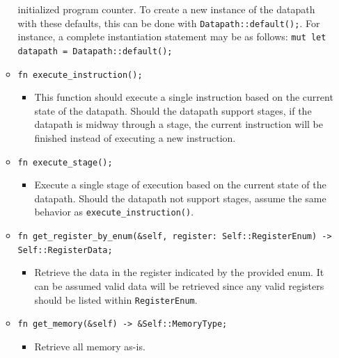 \documentclass[
    paper=letter,
    parskip=half,
    fontsize=12pt,
    titlepage=firstiscover,
    toc=bibliography,
    numbers=endperiod
]{scrartcl}
\providecommand{\tightlist}{%
  \setlength{\itemsep}{0pt}\setlength{\parskip}{0pt}}
\begin{document}
\begin{itemize}
\begin{itemize}
                    initialized program counter. To create a new instance of the datapath
                    with these defaults, this can be done with
                    \texttt{Datapath::default();}. For instance, a complete instantiation
                    statement may be as follows: \texttt{mut let datapath =
                        Datapath::default();}
              \item \texttt{fn execute\_instruction();}
                    \begin{itemize}
                        \tightlist
                        \item This function should execute a single instruction based on the current
                              state of the datapath. Should the datapath support stages, if the
                              datapath is midway through a stage, the current instruction will be
                              finished instead of executing a new instruction.
                    \end{itemize}
              \item \texttt{fn execute\_stage();}
                    \begin{itemize}
                        \tightlist
                        \item Execute a single stage of execution based on the current state of the
                              datapath. Should the datapath not support stages, assume the same
                              behavior as \texttt{execute\_instruction()}.
                    \end{itemize}
              \item \texttt{fn get\_register\_by\_enum(\&self, register: Self::RegisterEnum) -\textgreater{} Self::RegisterData;}
                    \begin{itemize}
                        \tightlist
                        \item Retrieve the data in the register indicated by the provided enum. It can
                              be assumed valid data will be retrieved since any valid registers should
                              be listed within \texttt{RegisterEnum}.
                    \end{itemize}
              \item \texttt{fn get\_memory(\&self) -\textgreater{} \&Self::MemoryType;}
                    \begin{itemize}
                        \tightlist
                        \item Retrieve all memory as-is.
                    \end{itemize}
          \end{itemize}


\end{itemize}
\end{document}
